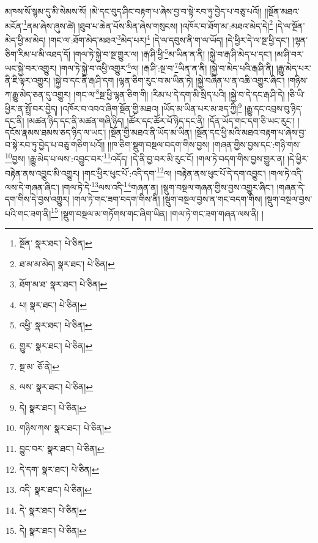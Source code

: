 མཁས་སོ་སྙམ་དུ་མི་སེམས་སོ། །མེ་དང་བུད་ཤིང་བརྟག་པ་ཞེས་བྱ་བ་སྟེ་རབ་ཏུ་བྱེད་པ་བཅུ་པའོ།། །།སྔོན་མཐའ་མངོན་\footnote{སྔོན་  སྣར་ཐང་།  པེ་ཅིན། }ནམ་ཞེས་ཞུས་ཚེ། །ཐུབ་པ་ཆེན་པོས་མིན་ཞེས་གསུངས། །འཁོར་བ་ཐོག་མ་:མཐའ་མེད་དེ།\footnote{ཐ་མ་མ་མེད།  སྣར་ཐང་།  པེ་ཅིན། } །དེ་ལ་སྔོན་མེད་ཕྱི་མ་མེད། །གང་ལ་:ཐོག་མེད་མཐའ་\footnote{ཐོག་མ་ཐ་  སྣར་ཐང་།  པེ་ཅིན། }མེད་པར།\footnote{པ།  སྣར་ཐང་།  པེ་ཅིན། } །དེ་ལ་དབུས་ནི་ག་ལ་ཡོད། །དེ་ཕྱིར་དེ་ལ་སྔ་ཕྱི་དང་། །ལྷན་ཅིག་རིམ་པ་མི་འཐད་དོ། །གལ་ཏེ་སྐྱེ་བ་སྔ་གྱུར་ལ། །རྒ་ཤི་ཕྱི་\footnote{འཕྱི་  སྣར་ཐང་།  པེ་ཅིན། }མ་ཡིན་ན་ནི། །སྐྱེ་བ་རྒ་ཤི་མེད་པ་དང་། །མ་ཤི་བར་ཡང་སྐྱེ་བར་འགྱུར། །གལ་ཏེ་སྐྱེ་བ་འཕྱི་འགྱུར་\footnote{གྱུར་  སྣར་ཐང་།  པེ་ཅིན། }ལ། །རྒ་ཤི་:སྔ་བ་\footnote{སྔ་མ་  ཅོ་ནེ། }ཡིན་ན་ནི། །སྐྱེ་བ་མེད་པའི་རྒ་ཤི་ནི། །རྒྱུ་མེད་པར་ནི་ཇི་ལྟར་འགྱུར། །སྐྱེ་བ་དང་ནི་རྒ་ཤི་དག །ལྷན་ཅིག་རུང་བ་མ་ཡིན་ཏེ། །སྐྱེ་བཞིན་པ་ན་འཆི་འགྱུར་ཞིང་། །གཉིས་ཀ་རྒྱུ་མེད་ཅན་དུ་འགྱུར། །གང་ལ་\footnote{ལས་  སྣར་ཐང་།  པེ་ཅིན། }སྔ་ཕྱི་ལྷན་ཅིག་གི། །རིམ་པ་དེ་དག་མི་སྲིད་པའི། །སྐྱེ་བ་དེ་དང་རྒ་ཤི་དེ། །ཅི་ཡི་ཕྱིར་ན་སྤྲོ་བར་བྱེད། །འཁོར་བ་འབའ་ཞིག་སྔོན་གྱི་མཐའ། །ཡོད་མ་ཡིན་པར་མ་ཟད་ཀྱི།\footnote{དེ།  སྣར་ཐང་།  པེ་ཅིན། } །རྒྱུ་དང་འབྲས་བུ་ཉིད་དང་ནི། །མཚན་ཉིད་དང་ནི་མཚན་གཞི་ཉིད། །ཚོར་དང་ཚོར་པོ་ཉིད་དང་ནི། །དོན་ཡོད་གང་དག་ཅི་ཡང་རུང་། །དངོས་རྣམས་ཐམས་ཅད་ཉིད་ལ་ཡང་། །སྔོན་གྱི་མཐའ་ནི་ཡོད་མ་ཡིན། །སྔོན་དང་ཕྱི་མའི་མཐའ་བརྟག་པ་ཞེས་བྱ་བ་སྟེ་རབ་ཏུ་བྱེད་པ་བཅུ་གཅིག་པའོ།། །།ཁ་ཅིག་སྡུག་བསྔལ་བདག་གིས་བྱས། །གཞན་གྱིས་བྱས་དང་:གཉི་གས་\footnote{གཉིས་ཀས་  སྣར་ཐང་།  པེ་ཅིན། }བྱས། །རྒྱུ་མེད་པ་ལས་:འབྱུང་བར་\footnote{བྱུང་བར་  སྣར་ཐང་།  པེ་ཅིན། }འདོད། །དེ་ནི་བྱ་བར་མི་རུང་ངོ། །གལ་ཏེ་བདག་གིས་བྱས་གྱུར་ན། །དེ་ཕྱིར་བརྟེན་ནས་འབྱུང་མི་འགྱུར། །གང་ཕྱིར་ཕུང་པོ་:འདི་དག་\footnote{དེ་དག་  སྣར་ཐང་།  པེ་ཅིན། }ལ། །བརྟེན་ནས་ཕུང་པོ་དེ་དག་འབྱུང་། །གལ་ཏེ་འདི་ལས་དེ་གཞན་ཞིང་། །གལ་ཏེ་དེ་\footnote{འདི་  སྣར་ཐང་།  པེ་ཅིན། }ལས་འདི་\footnote{དེ་  སྣར་ཐང་།  པེ་ཅིན། }གཞན་ན། །སྡུག་བསྔལ་གཞན་གྱིས་བྱས་འགྱུར་ཞིང་། །གཞན་དེ་དག་གིས་དེ་བྱས་འགྱུར། །གལ་ཏེ་གང་ཟག་བདག་གིས་ནི། །སྡུག་བསྔལ་བྱས་ན་གང་བདག་གིས། །སྡུག་བསྔལ་བྱས་པའི་གང་ཟག་ནི།\footnote{དེ།  སྣར་ཐང་།  པེ་ཅིན། } །སྡུག་བསྔལ་མ་གཏོགས་གང་ཞིག་ཡིན། །གལ་ཏེ་གང་ཟག་གཞན་ལས་ནི། །
